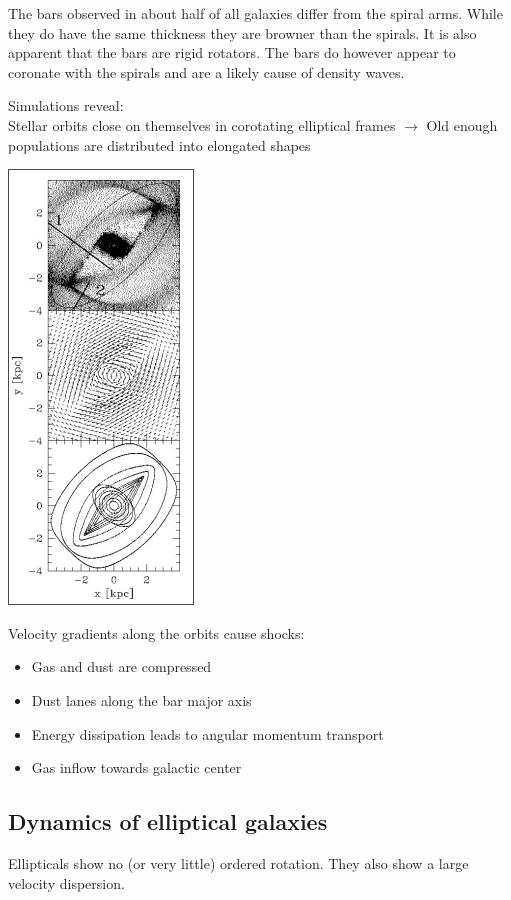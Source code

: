 \documentclass[11pt,a4paper]{article}
\begin{document}
The bars observed in about half of all galaxies differ from the spiral arms. 
While they do have the same thickness they are browner than the spirals.
It is also apparent that the bars are rigid rotators. 
The bars do however appear to coronate with the spirals and are a likely cause of density waves. 

Simulations reveal:  \\
Stellar orbits close on themselves in corotating elliptical frames $\rightarrow$ Old enough populations are
distributed into elongated shapes
\begin{center}
    \includegraphics[width=0.3\linewidth]{screenshot_2024-01-26-141350.png}
\end{center}
Velocity gradients along the orbits cause shocks: 
\begin{itemize}
    \item Gas and dust are compressed
    \item Dust lanes along the bar major axis
    \item Energy dissipation leads to angular momentum transport
    \item Gas inflow towards galactic center
\end{itemize}
\subsection{Dynamics of elliptical galaxies}
Ellipticals show no (or
very little) ordered
rotation.
They also show a large velocity dispersion. 
\end{document}

